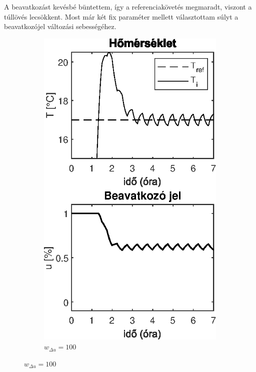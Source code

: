 A beavatkozást kevésbé büntettem, így a referenciakövetés megmaradt, viszont a túllövés lecsökkent. Most már két fix paraméter mellett választottam súlyt a beavatkozójel változási sebességéhez.

\begin{figure}[H]
\begin{subfigure}[t]{0.32\textwidth}
	\centering
	\includegraphics[width=\textwidth]{figures/realsys/mpc-wdu-100}
	\caption{$w_{\Delta u}=100$}
	\label{fig:mpc-wdu-100}
\end{subfigure}

\end{figure}
